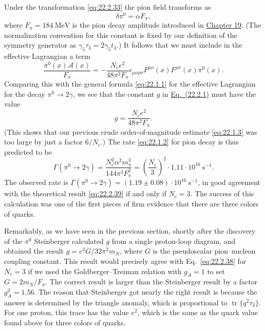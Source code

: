 Under the transformation \eqref{eq:22.2.33} the pion field transforms as
\begin{equation}
 \delta\pi^0=\alpha F_\pi,
 \tag{22.2.36}\label{eq:22.2.36}
\end{equation}
where $F_\pi=184\ \mathrm{MeV}$ is the pion decay amplitude introduced in
\hyperref[sec:19.4]{Chapter 19}. (The normalization convention for this
constant is fixed by our definition of the symmetry generator as
$\gamma_5\tau_3=2\gamma_5t_3$.) It follows that we must include in the
effective Lagrangian a term
\begin{equation}
 \frac{\pi^0(x)\mathcal A(x)}{F_\pi}
 =-\frac{N_ce^2}{48\pi^2F_\pi}\epsilon_{\mu\nu\rho\sigma}
 F^{\mu\nu}(x)F^{\rho\sigma}(x)\pi^0(x).
 \tag{22.2.37}\label{eq:22.2.37}
\end{equation}
Comparing this with the general formula \eqref{eq:22.1.1} for the
effective Lagrangian for the decay $\pi^0\to2\gamma$, we see that the
constant $g$ in \hyperref[eq:22.2.1]{Eq.~(22.2.1)} must have the value
\begin{equation}
 g=\frac{N_ce^2}{48\pi^2F_\pi}.
 \tag{22.2.38}\label{eq:22.2.38}
\end{equation}
(This shows that our previous crude order-of-magnitude estimate
\eqref{eq:22.1.3} was too large by just a factor $6/N_c$.) The rate
\eqref{eq:22.1.2} for pion decay is thus predicted to be
\begin{equation}
 \Gamma(\pi^0\to2\gamma)
 =\frac{N_c^2\alpha^2m_\pi^3}{144\pi^3F_\pi^2}
 =\left(\frac{N_c}{3}\right)^2
 \cdot1.11\cdot10^{16}\ \mathrm{s}^{-1}.
 \tag{22.2.39}\label{eq:22.2.39}
\end{equation}
The observed rate is
$\Gamma(\pi^0\to2\gamma)=(1.19\mathbin{\pm}0.08)\cdot10^{16}\
\mathrm{s}^{-1}$, in good agreement with the theoretical result
\eqref{eq:22.2.39} if and only if $N_c=3$. The success of this calculation
was one of the first pieces of firm evidence that there are three colors of
quarks.

Remarkably, as we have seen in the previous section, shortly after the
discovery of the $\pi^0$ Steinberger calculated $g$ from a single
proton-loop diagram, and obtained the result
$g=e^2G/32\pi^2m_N$, where $G$ is the pseudoscalar pion--nucleon coupling
constant. This result would precisely agree with Eq.~\eqref{eq:22.2.38}
for $N_c=3$ if we used the Goldberger--Treiman relation with $g_A=1$ to
set $G=2m_N/F_\pi$. The correct result is larger than the Steinberger
result by a factor $g_A^2=1.56$. The reason that Steinberger got nearly the
right result is because the answer is determined by the triangle anomaly,
which is proportional to $\operatorname{tr}\{q^2\tau_3\}$. For one proton,
this trace has the value $e^2$, which is the same as the quark value found
above for three colors of quarks.

